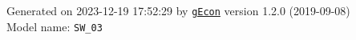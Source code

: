 \documentclass[10pt,a4paper]{article}
\numberwithin{equation}{section}
\begin{document}
\begin{landscape}
\begin{flushleft}{\large
Generated  on 2023-12-19 17:52:29 by \href{http://gecon.r-forge.r-project.org/}{\texttt{gEcon}} version 1.2.0 (2019-09-08)\\
Model name: \verb+SW_03+
}\end{flushleft}


\end{landscape}

\end{document}
